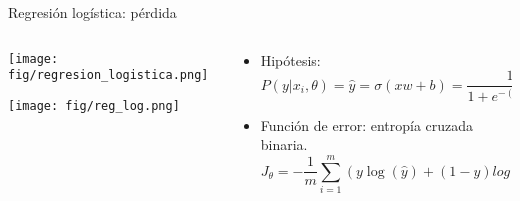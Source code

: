 \documentclass[aspectratio=169,9pt]{beamer}
\begin{document}
\begin{frame}{Regresión logística: pérdida}
	\begin{columns}
		\begin{column}{0.55\textwidth}
	\begin{flushleft}
		\texttt{[image: fig/regresion\_logistica.png]}
	\end{flushleft}
	\texttt{[image: fig/reg\_log.png]}
		\end{column}
		\begin{column}{0.55\textwidth}
			\begin{itemize}
				\item Hipótesis:
				\begin{equation*}
					P(y|x_i,\theta) = \hat{y}= \sigma(xw + b) =\frac{1}{1 + e^{-(xw + b)}}
				\end{equation*}
			
				\item Función de error: entropía cruzada binaria.
				\begin{equation*}
					J_\theta = - \frac{1}{m} \sum_{i=1}^{m} (y \log(\hat{y})+(1-y)log(1-\hat{y})) 
				\end{equation*}
			\end{itemize}
		\end{column}
	\end{columns}
\end{frame}
\end{document}
